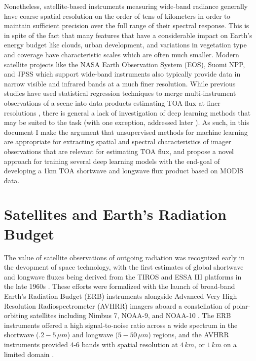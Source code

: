 \documentclass[12pt]{article}
\begin{document}
Nonetheless, satellite-based instruments measuring wide-band radiance generally have coarse spatial resolution on the order of tens of kilometers in order to maintain sufficient precision over the full range of their spectral response. This is in spite of the fact that many features that have a considerable impact on Earth's energy budget like clouds, urban development, and variations in vegetation type and coverage have characteristic scales which are often much smaller. Modern satellite projects like the NASA Earth Observation System (EOS), Suomi NPP, and JPSS which support wide-band instruments also typically provide data in narrow visible and infrared bands at a much finer resolution. While previous studies have used statistical regression techniques to merge multi-instrument observations of a scene into data products estimating TOA flux at finer resolutions \cite{wang_estimating_2016}\cite{loeb_fusion_2006}, there is general a lack of investigation of deep learning methods that may be suited to the task (with one exception, addressed later \cite{li_evaluation_2022}). As such, in this document I make the argument that unsupervised methods for machine learning are appropriate for extracting spatial and spectral characteristics of imager observations that are relevant for estimating TOA flux, and propose a novel approach for training several deep learning models with the end-goal of developing a 1km TOA shortwave and longwave flux product based on MODIS data.

\vspace{-1em}
\section{Satellites and Earth's Radiation Budget}
\vspace{-1em}

The value of satellite observations of outgoing radiation was recognized early in the devopment of space technology, with the first estimates of global shortwave and longwave fluxes being derived from the TIROS and ESSA III platforms in the late 1960s \cite{house_radiation_1965}\cite{vonder_haar_satellite_1969}. These efforts were formalized with the launch of broad-band Earth's Radiation Budget (ERB) instruments alongside Advanced Very High Resolution Radiospectrometer (AVHRR) imagers aboard a constellation of polar-orbiting satellites including Nimbus 7, NOAA-9, and NOAA-10 \cite{barkstrom_earth_1984}. The ERB instruments offered a high signal-to-noise ratio across a wide spectrum in the shortwave ($.2-5\,\si{\mu m}$) and longwave ($5-50\,\si{\mu m}$) regions, and the AVHRR instruments provided 4-6 bands with spatial resolution at $4\,\si{km}$, or $1\,\si{km}$ on a limited domain \cite{shenk_noaa-10_nodate}.
\end{document}
